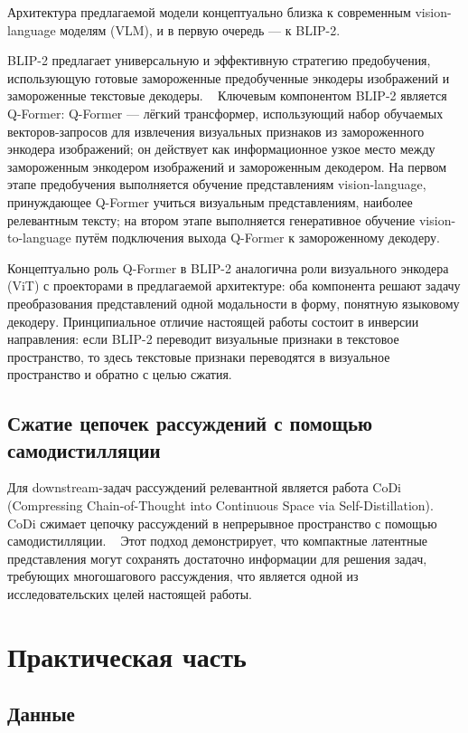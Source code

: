 \documentclass[a4paper,12pt]{extarticle}
\begin{document}
Архитектура предлагаемой модели концептуально близка к современным vision-language моделям (VLM), и в первую очередь — к BLIP-2.

BLIP-2 предлагает универсальную и эффективную стратегию предобучения, использующую готовые замороженные предобученные энкодеры изображений и замороженные текстовые декодеры. ~\cite{blip_2} Ключевым компонентом BLIP-2 является Q-Former: Q-Former — лёгкий трансформер, использующий набор обучаемых векторов-запросов для извлечения визуальных признаков из замороженного энкодера изображений; он действует как информационное узкое место между замороженным энкодером изображений и замороженным декодером. На первом этапе предобучения выполняется обучение представлениям vision-language, принуждающее Q-Former учиться визуальным представлениям, наиболее релевантным тексту; на втором этапе выполняется генеративное обучение vision-to-language путём подключения выхода Q-Former к замороженному декодеру.

Концептуально роль Q-Former в BLIP-2 аналогична роли визуального энкодера (ViT) с проекторами в предлагаемой архитектуре: оба компонента решают задачу преобразования представлений одной модальности в форму, понятную языковому декодеру. Принципиальное отличие настоящей работы состоит в инверсии направления: если BLIP-2 переводит визуальные признаки в текстовое пространство, то здесь текстовые признаки переводятся в визуальное пространство и обратно с целью сжатия.

\subsection{Сжатие цепочек рассуждений с помощью самодистилляции}

Для downstream-задач рассуждений релевантной является работа CoDi (Compressing Chain-of-Thought into Continuous Space via Self-Distillation). CoDi сжимает цепочку рассуждений в непрерывное пространство с помощью самодистилляции. ~\cite{codi} Этот подход демонстрирует, что компактные латентные представления могут сохранять достаточно информации для решения задач, требующих многошагового рассуждения, что является одной из исследовательских целей настоящей работы.




\section{Практическая часть}

\subsection{Данные}
\end{document}
